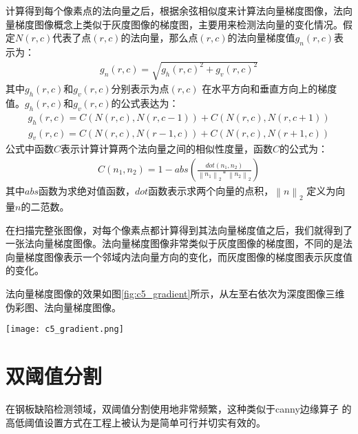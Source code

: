     计算得到每个像素点的法向量之后，根据余弦相似度来计算法向量梯度图像，法向量梯度图像概念上类似于灰度图像的梯度图，主要用来检测法向量的变化情况。假定$N\left({r,c}\right)$代表了点$\left({r,c}\right)$的法向量，那么点$\left({r,c}\right)$的法向量梯度值$g_n\left({r,c}\right)$表示为：
    \begin{eqnarray}
    g_n\left({r,c}\right)=\sqrt{{g_h\left({r,c}\right)}^{2}+{g_v\left({r,c}\right)}^{2}}
    \end{eqnarray}
    其中$g_h\left({r,c}\right)$和$g_v\left({r,c}\right)$分别表示为点$\left({r,c}\right)$ 在水平方向和垂直方向上的梯度值。$g_h\left({r,c}\right)$和$g_v\left({r,c}\right)$的公式表达为：
    \begin{eqnarray}
    g_h\left({r,c}\right)=C\left({N\left({r,c}\right),N\left({r,c-1}\right)}\right)+C\left({N\left({r,c}\right),N\left({r,c+1}\right)}\right)
    \end{eqnarray}
    \begin{eqnarray}
    g_v\left({r,c}\right)=C\left({N\left({r,c}\right),N\left({r-1,c}\right)}\right)+C\left({N\left({r,c}\right),N\left({r+1,c}\right)}\right)
    \end{eqnarray}
    公式中函数$C$表示计算计算两个法向量之间的相似性度量，函数$C$的公式为：
    \begin{eqnarray}
    C\left({n_1,n_2}\right)=1-abs\left({\frac{dot\left({n_1,n_2}\right)}{{\left\|n_1\right\|}_2*{\left\|n_2\right\|}_2}}\right)
    \end{eqnarray}
    其中$abs$函数为求绝对值函数，$dot$函数表示求两个向量的点积，${\left\|n\right\|}_2$ 定义为向量$n$的二范数。

    在扫描完整张图像，对每个像素点都计算得到其法向量梯度值之后，我们就得到了一张法向量梯度图像。法向量梯度图像非常类似于灰度图像的梯度图，不同的是法向量梯度图像表示一个邻域内法向量方向的变化，而灰度图像的梯度图表示灰度值的变化。

    法向量梯度图像的效果如图\ref{fig:c5_gradient}所示，从左至右依次为深度图像三维伪彩图、法向量梯度图像。

    \begin{figure*}[!h]
    \centering
    \texttt{[image: c5\_gradient.png]}
    \caption{法向量梯度图像}
    \label{fig:c5_gradient}
    \end{figure*}

    \section{双阈值分割}
    在钢板缺陷检测领域，双阈值分割使用地非常频繁，这种类似于canny边缘算子\cite{Canny1986A} 的高低阈值设置方式在工程上被认为是简单可行并切实有效的。


